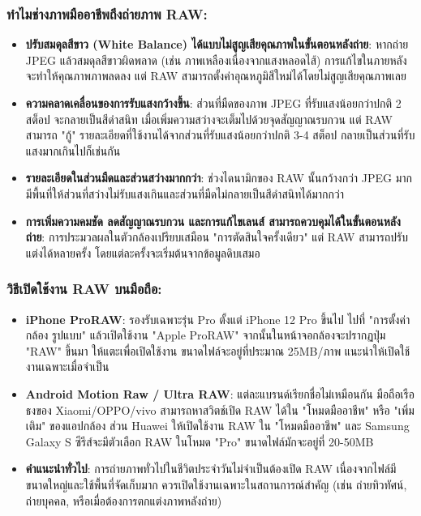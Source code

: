 \subsubsection*{ทำไมช่างภาพมืออาชีพถึงถ่ายภาพ RAW:}

\begin{itemize}
  \item \textbf{ปรับสมดุลสีขาว (White Balance) ได้แบบไม่สูญเสียคุณภาพในขั้นตอนหลังถ่าย}: หากถ่าย JPEG แล้วสมดุลสีขาวผิดพลาด (เช่น ภาพเหลืองเนื่องจากแสงหลอดไส้) การแก้ไขในภายหลังจะทำให้คุณภาพภาพลดลง แต่ RAW สามารถตั้งค่าอุณหภูมิสีใหม่ได้โดยไม่สูญเสียคุณภาพเลย
  \item \textbf{ความคลาดเคลื่อนของการรับแสงกว้างขึ้น}: ส่วนที่มืดของภาพ JPEG ที่รับแสงน้อยกว่าปกติ 2 สต็อป จะกลายเป็นสีดำสนิท เมื่อเพิ่มความสว่างจะเต็มไปด้วยจุดสัญญาณรบกวน แต่ RAW สามารถ "กู้" รายละเอียดที่ใช้งานได้จากส่วนที่รับแสงน้อยกว่าปกติ 3-4 สต็อป กลายเป็นส่วนที่รับแสงมากเกินไปก็เช่นกัน
  \item \textbf{รายละเอียดในส่วนมืดและส่วนสว่างมากกว่า}: ช่วงไดนามิกของ RAW นั้นกว้างกว่า JPEG มาก มีพื้นที่ให้ส่วนที่สว่างไม่รับแสงเกินและส่วนที่มืดไม่กลายเป็นสีดำสนิทได้มากกว่า
  \item \textbf{การเพิ่มความคมชัด ลดสัญญาณรบกวน และการแก้ไขเลนส์ สามารถควบคุมได้ในขั้นตอนหลังถ่าย}: การประมวลผลในตัวกล้องเปรียบเสมือน "การตัดสินใจครั้งเดียว" แต่ RAW สามารถปรับแต่งได้หลายครั้ง โดยแต่ละครั้งจะเริ่มต้นจากข้อมูลดิบเสมอ
\end{itemize}

\subsubsection*{วิธีเปิดใช้งาน RAW บนมือถือ:}

\begin{itemize}
  \item \textbf{iPhone ProRAW}: รองรับเฉพาะรุ่น Pro ตั้งแต่ iPhone 12 Pro ขึ้นไป ไปที่ "การตั้งค่า กล้อง รูปแบบ" แล้วเปิดใช้งาน "Apple ProRAW" จากนั้นในหน้าจอกล้องจะปรากฏปุ่ม "RAW" ขึ้นมา ให้แตะเพื่อเปิดใช้งาน ขนาดไฟล์จะอยู่ที่ประมาณ 25MB/ภาพ แนะนำให้เปิดใช้งานเฉพาะเมื่อจำเป็น
  \item \textbf{Android Motion Raw / Ultra RAW}: แต่ละแบรนด์เรียกชื่อไม่เหมือนกัน มือถือเรือธงของ Xiaomi/OPPO/vivo สามารถหาสวิตช์เปิด RAW ได้ใน "โหมดมืออาชีพ" หรือ "เพิ่มเติม" ของแอปกล้อง ส่วน Huawei ให้เปิดใช้งาน RAW ใน "โหมดมืออาชีพ" และ Samsung Galaxy S ซีรีส์จะมีตัวเลือก RAW ในโหมด "Pro" ขนาดไฟล์มักจะอยู่ที่ 20-50MB
  \item \textbf{คำแนะนำทั่วไป}: การถ่ายภาพทั่วไปในชีวิตประจำวันไม่จำเป็นต้องเปิด RAW เนื่องจากไฟล์มีขนาดใหญ่และใช้พื้นที่จัดเก็บมาก ควรเปิดใช้งานเฉพาะในสถานการณ์สำคัญ (เช่น ถ่ายทิวทัศน์, ถ่ายบุคคล, หรือเมื่อต้องการตกแต่งภาพหลังถ่าย)
\end{itemize}


